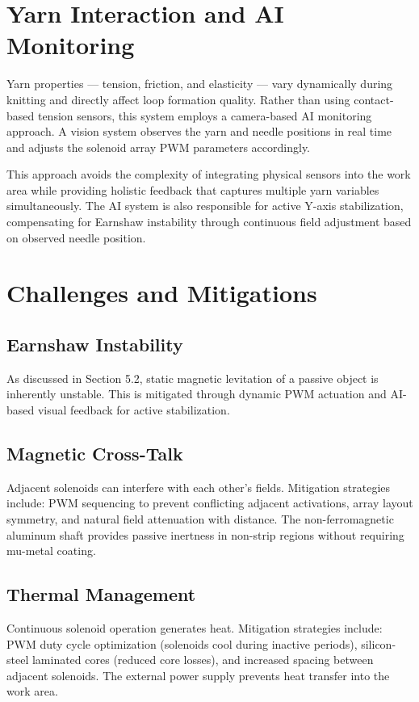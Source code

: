 \documentclass[10pt]{article}
\begin{document}
\section{Yarn Interaction and AI Monitoring}
Yarn properties --- tension, friction, and elasticity --- vary dynamically during knitting and directly affect loop formation quality. Rather than using contact-based tension sensors, this system employs a camera-based AI monitoring approach. A vision system observes the yarn and needle positions in real time and adjusts the solenoid array PWM parameters accordingly.

This approach avoids the complexity of integrating physical sensors into the work area while providing holistic feedback that captures multiple yarn variables simultaneously. The AI system is also responsible for active Y-axis stabilization, compensating for Earnshaw instability through continuous field adjustment based on observed needle position.

\section{Challenges and Mitigations}
\subsection{Earnshaw Instability}
As discussed in Section 5.2, static magnetic levitation of a passive object is inherently unstable. This is mitigated through dynamic PWM actuation and AI-based visual feedback for active stabilization.

\subsection{Magnetic Cross-Talk}
Adjacent solenoids can interfere with each other's fields. Mitigation strategies include: PWM sequencing to prevent conflicting adjacent activations, array layout symmetry, and natural field attenuation with distance. The non-ferromagnetic aluminum shaft provides passive inertness in non-strip regions without requiring mu-metal coating.

\subsection{Thermal Management}
Continuous solenoid operation generates heat. Mitigation strategies include: PWM duty cycle optimization (solenoids cool during inactive periods), silicon-steel laminated cores (reduced core losses), and increased spacing between adjacent solenoids. The external power supply prevents heat transfer into the work area.
\end{document}

